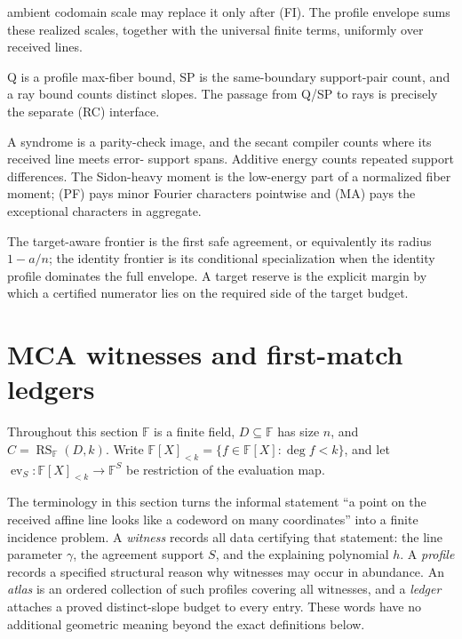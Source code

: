 \documentclass[12pt,a4paper]{amsart}
\numberwithin{equation}{section}
\theoremstyle{remark}
\DeclareMathOperator{\RS}{RS}
\newcommand{\F}{\mathbb F}
\begin{document}
\begin{description}[leftmargin=0pt,labelindent=0pt]
ambient codomain scale may replace it only after \textup{(FI)}.  The
profile envelope sums these realized scales, together with the universal
finite terms, uniformly over received lines.
\item[Q, SP, and rays.] Q is a profile max-fiber bound, SP is the
same-boundary support-pair count, and a ray bound counts distinct slopes.
The passage from Q/SP to rays is precisely the separate \textup{(RC)}
interface.
\item[Syndrome, energy, and Fourier payment.] A syndrome is a parity-check
image, and the secant compiler counts where its received line meets error-
support spans.  Additive energy counts repeated support differences.  The
Sidon-heavy moment is the low-energy part of a normalized fiber moment;
\textup{(PF)} pays minor Fourier characters pointwise and
\textup{(MA)} pays the exceptional characters in aggregate.
\item[Frontier.] The target-aware frontier is the first safe agreement, or
equivalently its radius \(1-a/n\); the identity frontier is its conditional
specialization when the identity profile dominates the full envelope.  A
target reserve is the explicit margin by which a certified numerator lies
on the required side of the target budget.
\end{description}

\section{MCA witnesses and first-match ledgers}\label{sec:mca-ledger}

Throughout this section \(\F\) is a finite field, \(D\subseteq\F\) has
size \(n\), and \(C=\RS_\F(D,k)\).  Write
\(\F[X]_{<k}=\{f\in\F[X]:\deg f<k\}\), and let
\(\operatorname{ev}_S:\F[X]_{<k}\to\F^S\) be restriction of the
evaluation map.

The terminology in this section turns the informal statement ``a point on
the received affine line looks like a codeword on many coordinates'' into a
finite incidence problem.  A \emph{witness} records all data certifying that
statement: the line parameter \(\gamma\), the agreement support \(S\), and
the explaining polynomial \(h\).  A \emph{profile} records a specified
structural reason why witnesses may occur in abundance.  An \emph{atlas} is
an ordered collection of such profiles covering all witnesses, and a
\emph{ledger} attaches a proved distinct-slope budget to every entry.  These
words have no additional geometric meaning beyond the exact definitions
below.
\end{document}
